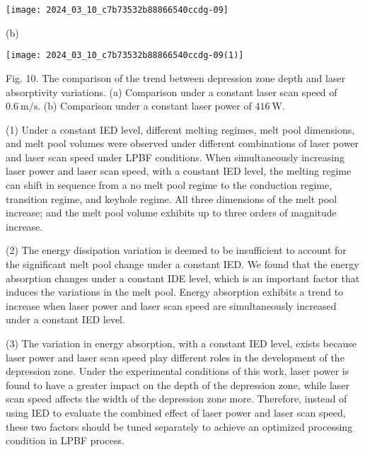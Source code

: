 \documentclass[10pt]{article}
\begin{document}
\begin{center}
\texttt{[image: 2024\_03\_10\_c7b73532b88866540ccdg-09]}
\end{center}

(b)

\begin{center}
\texttt{[image: 2024\_03\_10\_c7b73532b88866540ccdg-09(1)]}
\end{center}

Fig. 10. The comparison of the trend between depression zone depth and laser absorptivity variations. (a) Comparison under a constant laser scan speed of $0.6 \mathrm{~m} / \mathrm{s}$. (b) Comparison under a constant laser power of $416 \mathrm{~W}$.

(1) Under a constant IED level, different melting regimes, melt pool dimensions, and melt pool volumes were observed under different combinations of laser power and laser scan speed under LPBF conditions. When simultaneously increasing laser power and laser scan speed, with a constant IED level, the melting regime can shift in sequence from a no melt pool regime to the conduction regime, transition regime, and keyhole regime. All three dimensions of the melt pool increase; and the melt pool volume exhibits up to three orders of magnitude increase.

(2) The energy dissipation variation is deemed to be insufficient to account for the significant melt pool change under a constant IED. We found that the energy absorption changes under a constant IDE level, which is an important factor that induces the variations in the melt pool. Energy absorption exhibits a trend to increase when laser power and laser scan speed are simultaneously increased under a constant IED level.

(3) The variation in energy absorption, with a constant IED level, exists because laser power and laser scan speed play different roles in the development of the depression zone. Under the experimental conditions of this work, laser power is found to have a greater impact on the depth of the depression zone, while laser scan speed affects the width of the depression zone more. Therefore, instead of using IED to evaluate the combined effect of laser power and laser scan speed, these two factors should be tuned separately to achieve an optimized processing condition in LPBF process.
\end{document}
